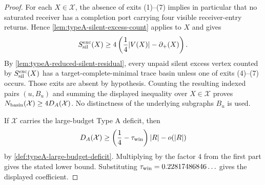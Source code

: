 \documentclass[11pt]{article}
\newcommand{\defp}{\partial_+}
\begin{document}
\begin{proof}
For each $X\in\mathcal X$, the absence of exits (1)--(7) implies in particular
that no saturated receiver has a completion port carrying four visible
receiver-entry returns.  Hence
\cref{lem:typeA-silent-excess-count} applies to $X$ and gives
\[
S_{\rm sil}^{\rm exc}(X)\ge
4\left(\frac14|V(X)|-\defp(X)\right).
\]
By \cref{lem:typeA-reduced-silent-residual}, every unpaid silent excess vertex
counted by $S_{\rm sil}^{\rm exc}(X)$ has a target-complete-minimal trace basin
unless one of exits (4)--(7) occurs.  Those exits are absent by hypothesis.
Counting the resulting indexed pairs $(u,B_u)$ and summing the displayed
inequality over $X\in\mathcal X$ proves
$N_{\rm basin}(\mathcal X)\ge4D_A(\mathcal X)$.  No distinctness of the
underlying subgraphs $B_u$ is used.

If $\mathcal X$ carries the large-budget Type A deficit, then
\[
D_A(\mathcal X)\ge
\left(\frac14-\tau_{\rm win}\right)|R|-o(|R|)
\]
by \cref{def:typeA-large-budget-deficit}.  Multiplying by the factor $4$ from
the first part gives the stated lower bound.  Substituting
$\tau_{\rm win}=0.22817486846\ldots$ gives the displayed coefficient.
\end{proof}
\end{document}
